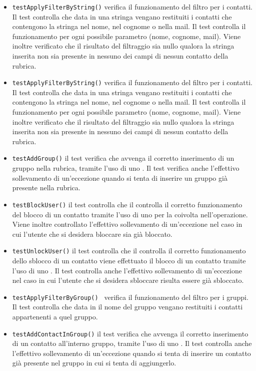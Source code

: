 \begin{itemize}
\begin{itemize}
\item \texttt{testApplyFilterByString()} verifica il funzionamento del filtro per i contatti. Il test controlla che data in  una stringa vengano restituiti i contatti che contengono la stringa nel nome, nel cognome o nella mail. Il test controlla il funzionamento per ogni possibile parametro (nome, cognome, mail). Viene inoltre verificato che il risultato del filtraggio sia nullo qualora la stringa inserita non sia presente in nessuno dei campi di nessun contatto della rubrica.
\item \texttt{testApplyFilterByString()} verifica il funzionamento del filtro per i contatti. Il test controlla che data in  una stringa vengano restituiti i contatti che contengono la stringa nel nome, nel cognome o nella mail. Il test controlla il funzionamento per ogni possibile parametro (nome, cognome, mail). Viene inoltre verificato che il risultato del filtraggio sia nullo qualora la stringa inserita non sia presente in nessuno dei campi di nessun contatto della rubrica.
\item \texttt{testAddGroup()} il test verifica che avvenga il corretto inserimento di un gruppo nella rubrica, tramite l'uso di uno . Il test verifica anche l'effettivo sollevamento di un'eccezione quando si tenta di inserire un gruppo già presente nella rubrica.
\item \texttt{testBlockUser()} il test controlla che il controlla il corretto funzionamento del blocco di un contatto tramite l'uso di uno  per la  coivolta nell'operazione. Viene inoltre controllato l'effettivo sollevamento di un'eccezione nel caso in cui l'utente che si desidera bloccare sia già bloccato.
\item \texttt{testUnlockUser()} il test controlla che il controlla il corretto funzionamento dello sblocco di un contatto viene effettuato il blocco di un contatto tramite l'uso di uno . Il test controlla anche l'effettivo sollevamento di un'eccezione nel caso in cui l'utente che si desidera sbloccare risulta essere già sbloccato.
\item \texttt{testApplyFilterByGroup() } verifica il funzionamento del filtro per i gruppi. Il test controlla che data in  il nome del gruppo vengano restituiti i contatti appartenenti a quel gruppo. 
\item \texttt{testAddContactInGroup()} il test verifica che avvenga il corretto inserimento di un contatto all'interno gruppo, tramite l'uso di uno . Il test controlla anche l'effettivo sollevamento di un'eccezione quando si tenta di inserire un contatto già presente nel gruppo in cui si tenta di aggiungerlo.

\end{itemize}
\end{itemize}
